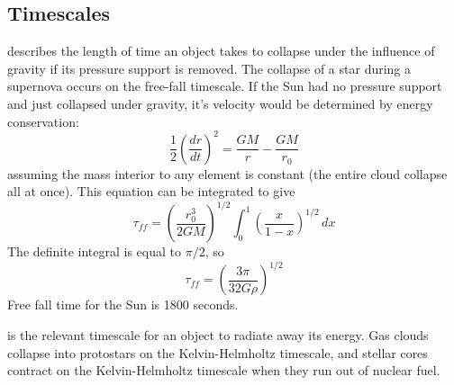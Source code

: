\subsection{Timescales}
 describes the length of time an object takes to collapse
under the influence of gravity if its pressure support is removed.  The collapse of a star
during a supernova occurs on the free-fall timescale.
If the Sun had no pressure support and just collapsed under gravity, it's velocity would be 
determined by energy conservation:
\begin{equation}
\frac{1}{2}\left(\frac{dr}{dt}\right)^2 = \frac{GM}{r}-\frac{GM}{r_0}
\end{equation}
assuming the mass interior to any element is constant (the entire cloud collapse all at once).
This equation can be integrated to give
\begin{equation}
\tau_{ff}=\left(\frac{r_0^3}{2GM}\right)^{1/2}\int_0^1\left(\frac{x}{1-x}\right)^{1/2}\,dx
\end{equation}
The definite integral is equal to $\pi/2$, so
\begin{equation}\boxed{
\tau_{ff}=\left(\frac{3\pi}{32G\rho}\right)^{1/2}
}\end{equation}
Free fall time for the Sun is 1800 seconds.

 is the relevant timescale for an object to
radiate away its energy.  Gas clouds collapse into protostars on the Kelvin-Helmholtz timescale,
and stellar cores contract on the Kelvin-Helmholtz timescale when they run out of nuclear fuel.

